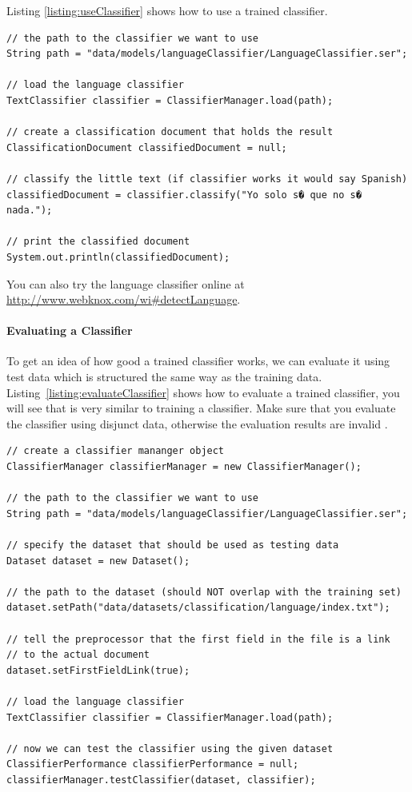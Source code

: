\documentclass[a4paper,twoside]{book}      %
\begin{document}
Listing \ref{listing:useClassifier} shows how to use a trained classifier.

\begin{codelisting}
\begin{lstlisting}[label=listing:useClassifier,caption=Use a trained text classifier.,frame=tb]
// the path to the classifier we want to use
String path = "data/models/languageClassifier/LanguageClassifier.ser";

// load the language classifier
TextClassifier classifier = ClassifierManager.load(path);

// create a classification document that holds the result
ClassificationDocument classifiedDocument = null;

// classify the little text (if classifier works it would say Spanish)
classifiedDocument = classifier.classify("Yo solo s� que no s� nada.");

// print the classified document
System.out.println(classifiedDocument);
\end{lstlisting}
\end{codelisting}

You can also try the language classifier online at \url{http://www.webknox.com/wi#detectLanguage}.

\paragraph{Evaluating a Classifier}
To get an idea of how good a trained classifier works, we can evaluate it using test data which is structured the same way as the training data. Listing~\ref{listing:evaluateClassifier} shows how to evaluate a trained classifier, you will see that is very similar to training a classifier. Make sure that you evaluate the classifier using disjunct data, otherwise the evaluation results are invalid .

\begin{codelisting}
\begin{lstlisting}[label=listing:evaluateClassifier,caption=Evaluating a trained text classifier.,frame=tb]
// create a classifier mananger object
ClassifierManager classifierManager = new ClassifierManager();

// the path to the classifier we want to use
String path = "data/models/languageClassifier/LanguageClassifier.ser";

// specify the dataset that should be used as testing data
Dataset dataset = new Dataset();

// the path to the dataset (should NOT overlap with the training set)
dataset.setPath("data/datasets/classification/language/index.txt");

// tell the preprocessor that the first field in the file is a link
// to the actual document
dataset.setFirstFieldLink(true);

// load the language classifier
TextClassifier classifier = ClassifierManager.load(path);

// now we can test the classifier using the given dataset
ClassifierPerformance classifierPerformance = null;
classifierManager.testClassifier(dataset, classifier);
\end{lstlisting}
\end{codelisting}
\end{document}
